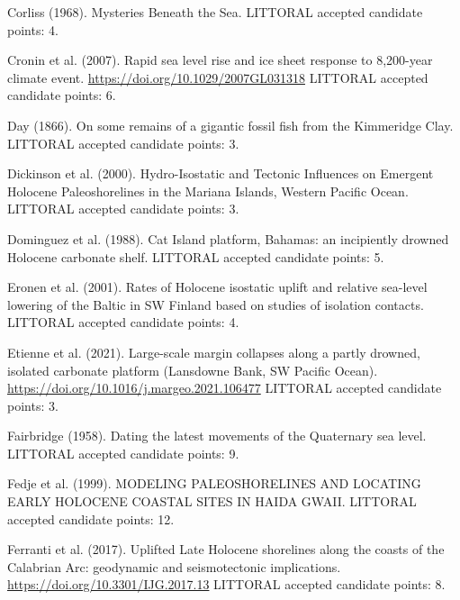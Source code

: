 \documentclass[twocolumn,10pt]{article}
\begin{document}
\begin{thebibliography}{}
Corliss (1968).
\newblock Mysteries Beneath the Sea.
\newblock LITTORAL accepted candidate points: 4.

Cronin et al. (2007).
\newblock Rapid sea level rise and ice sheet response to 8,200-year climate event.
\newblock \url{https://doi.org/10.1029/2007GL031318}
\newblock LITTORAL accepted candidate points: 6.

Day (1866).
\newblock On some remains of a gigantic fossil fish from the Kimmeridge Clay.
\newblock LITTORAL accepted candidate points: 3.

Dickinson et al. (2000).
\newblock Hydro-Isostatic and Tectonic Influences on Emergent Holocene Paleoshorelines in the Mariana Islands, Western Pacific Ocean.
\newblock LITTORAL accepted candidate points: 3.

Dominguez et al. (1988).
\newblock Cat Island platform, Bahamas: an incipiently drowned Holocene carbonate shelf.
\newblock LITTORAL accepted candidate points: 5.

Eronen et al. (2001).
\newblock Rates of Holocene isostatic uplift and relative sea-level lowering of the Baltic in SW Finland based on studies of isolation contacts.
\newblock LITTORAL accepted candidate points: 4.

Etienne et al. (2021).
\newblock Large-scale margin collapses along a partly drowned, isolated carbonate platform (Lansdowne Bank, SW Pacific Ocean).
\newblock \url{https://doi.org/10.1016/j.margeo.2021.106477}
\newblock LITTORAL accepted candidate points: 3.

Fairbridge (1958).
\newblock Dating the latest movements of the Quaternary sea level.
\newblock LITTORAL accepted candidate points: 9.

Fedje et al. (1999).
\newblock MODELING PALEOSHORELINES AND LOCATING EARLY HOLOCENE COASTAL SITES IN HAIDA GWAII.
\newblock LITTORAL accepted candidate points: 12.

Ferranti et al. (2017).
\newblock Uplifted Late Holocene shorelines along the coasts of the Calabrian Arc: geodynamic and seismotectonic implications.
\newblock \url{https://doi.org/10.3301/IJG.2017.13}
\newblock LITTORAL accepted candidate points: 8.


\end{thebibliography}
\end{document}
